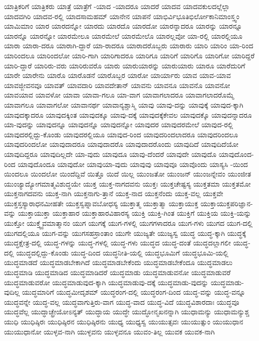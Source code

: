{ಯಾತ್ರಿಕರಿಗೆ
ಯಾತ್ರಿಕರು
ಯಾತ್ರೆ
ಯಾತ್ರೆಗೆ
-ಯಾದ
-ಯಾದರೂ
ಯಾದರೆ
ಯಾದವ
ಯಾದವಕುಲದಲ್ಲೆಲ್ಲಾ
ಯಾದವಗಿರಿ
ಯಾದವ-ರಲ್ಲಿ
ಯಾದಸಾಮಹಮ್
ಯಾನೇನ
ಯಾಪನೆ
ಯಾಭಿರ್ವಿಭೂತಿಭಿರ್ಲೋಕಾನಿಮಾಂಸ್ತ್ವಂ
ಯಾಮಿಮಾಂ
ಯಾರ
ಯಾರದನ್ನೋ
ಯಾರದು
ಯಾರದೊ
ಯಾರದೋ
ಯಾರನ್ನಾದರೂ
ಯಾರನ್ನು
ಯಾರನ್ನೂ
ಯಾರನ್ನೊ
ಯಾರನ್ನೋ
ಯಾರಮೇಲೂ
ಯಾರಮೇಲೆ
ಯಾರಮೇಲೊ
ಯಾರಲ್ಲವೋ
ಯಾ-ರಲ್ಲಿ
ಯಾರಲ್ಲಿಯೂ
ಯಾರಾ
ಯಾರಾ-ದರೂ
ಯಾರಾಗಿ-ದ್ದಾರೆ
ಯಾ-ರಾದರೂ
ಯಾರಾದರೊಬ್ಬರು
ಯಾರಾರು
ಯಾರಿ
ಯಾರಿಂ
ಯಾ-ರಿಂದ
ಯಾರಿಂದಲೂ
ಯಾರಿಂದಲೋ
ಯಾರಿ-ಗಾಗಿ
ಯಾರಿಗಾದರೂ
ಯಾರಿಗೂ
ಯಾರಿಗೆ
ಯಾರಿಗೊ
ಯಾರಿಗೋ
ಯಾರಿದ್ದರೆ
ಯಾರಿ-ದ್ದಾರೆ
ಯಾರಿರು-ವರು
ಯಾರಿರುವರೊ
ಯಾರು
ಯಾರುಯಾರನ್ನು
ಯಾರುಯಾರು
ಯಾರೂ
ಯಾರೆದುರಿಗೆ
ಯಾರೇ
ಯಾರೇನು
ಯಾರೊ
ಯಾರೊಡನೆ
ಯಾರೊಬ್ಬರ
ಯಾರೋ
ಯಾರ್ಯಾರು
ಯಾವ
ಯಾವ-ಯಾವ
ಯಾವಜ್ಜೀವನವೂ
ಯಾವತ್
ಯಾವದಾರಿ
ಯಾವದೇತಾನ್
ಯಾವನು
ಯಾವನೂ
ಯಾವನೊ
ಯಾವನೋ
ಯಾವಯಾವ
ಯಾವಳೋ
ಯಾವಾ
ಯಾವಾ-ಗಲೂ
ಯಾ-ವಾಗ
ಯಾವಾಗಲಾದರೂ
ಯಾವಾಗಲಾದರೊಮ್ಮೆ
ಯಾವಾಗಲೂ
ಯಾವಾಗಲೋ
ಯಾವಾನರ್ಥ
ಯಾವಾನ್ಯಶ್ಚಾಸ್ಮಿ
ಯಾವು
ಯಾವು-ದನ್ನು
ಯಾವುಕ್ಕೆ
ಯಾವುದ-ಕ್ಕಾಗಿ
ಯಾವುದಕ್ಕಾದರೂ
ಯಾವುದಕ್ಕಿಂತ
ಯಾವುದಕ್ಕೂ
ಯಾವು-ದಕ್ಕೆ
ಯಾವುದಕ್ಕೆಕೇವಲ
ಯಾವುದಕ್ಕೊ
ಯಾವುದನ್ನಾದರೂ
ಯಾ-ವುದನ್ನು
ಯಾವುದನ್ನೂ
ಯಾವುದನ್ನೊ
ಯಾವುದನ್ನೋ
ಯಾವುದರ
ಯಾವುದರಮೇಲೆ
ಯಾವುದ-ರಲ್ಲಿ
ಯಾವುದರಲ್ಲಿದ್ದು-ಕೊಂಡು
ಯಾವುದರಲ್ಲಿಯೂ
ಯಾವುದ-ರಿಂದ
ಯಾವುದರಿಂದಲಾದರೂ
ಯಾವುದರಿಂದಲೂ
ಯಾವುದರಿಂದಲೋ
ಯಾವುದಾದರೂ
ಯಾವುದಾದರೊ
ಯಾವುದಾದರೊಂದು
ಯಾವುದಿದೆ
ಯಾವುದಿದೆಯೋ
ಯಾವುದಿದ್ದರೂ
ಯಾವುದಿಲ್ಲದೇ
ಯಾ-ವುದು
ಯಾವುದೂ
ಯಾವು-ದೆಂದರೆ
ಯಾವುದೇ
ಯಾವುದೊ
ಯಾವುದೊಂದ-ರಿಂದ
ಯಾವುದೊಂದೂ
ಯಾವುದೋ
ಯಾವುಯಾ-ವುದು
ಯಾವುವು
ಯಾವುವೂ
ಯಾವೊಂದು
ಯಾಸ್ಯಸಿ
-ಯಿಂದ
ಯಿಂದಲೂ
ಯಿಂದಲೋ
ಯಿಂದೆದ್ದಿವೆ
ಯಿತ್ತೊ
ಯಿದೆ
ಯಿಲ್ಲ
ಯುಂಜತೋ
ಯುಂಜನ್
ಯುಂಜನ್ನೇವಂ
ಯುಂಜೀತ
ಯುಂಜ್ಯಾದ್ಯೋಗಮಾತ್ಮವಿಶುದ್ಧಯೇ
ಯುಕ್ತ
ಯುಕ್ತ-ನಾಗದವನು
ಯುಕ್ತಃ
ಯುಕ್ತಚೇಷ್ಟಸ್ಯ
ಯುಕ್ತತಮಾ
ಯುಕ್ತತಮೋ
ಯುಕ್ತನಾಗದವನು
ಯುಕ್ತ-ನಾಗಿ
ಯುಕ್ತನಾಗು-ತ್ತಾನೆ
ಯುಕ್ತ-ನಾದ
ಯುಕ್ತನೆಂದು
ಯುಕ್ತ-ವಲ್ಲ
ಯುಕ್ತವೇ
ಯುಕ್ತಸ್ತಸ್ಯಾರಾಧನಮೀಹತೇ
ಯುಕ್ತಸ್ವಪ್ನಾವಬೋಧಸ್ಯ
ಯುಕ್ತಾತ್ಮ
ಯುಕ್ತಾತ್ಮಾ
ಯುಕ್ತಾಯುಕ್ತ
ಯುಕ್ತಾಯುಕ್ತಪರಿಜ್ಞಾನ-ವನ್ನು
ಯುಕ್ತಾಯುಕ್ತಾ
ಯುಕ್ತಾಹಾರ
ಯುಕ್ತಾಹಾರವಿಹಾರಸ್ಯ
ಯುಕ್ತಿ
ಯುಕ್ತಿ-ಗಿಂತ
ಯುಕ್ತಿಗೆ
ಯುಕ್ತಿಯ
ಯುಕ್ತಿ-ಯನ್ನು
ಯುಕ್ತೋ
ಯುಕ್ತ್ವೈವಮಾತ್ಮಾನಂ
ಯುಗ
ಯುಗಕ್ಕೆ
ಯುಗ-ಗಳಲ್ಲಿ
ಯುಗಗಳಾದರೂ
ಯುಗ-ಗಳು
ಯುಗದ
ಯುಗ-ದಲ್ಲಿ
ಯುಗದಲ್ಲಿಯೂ
ಯುಗ-ವನ್ನು
ಯುಗಸಹಸ್ರಾಂತಾಂ
ಯುಗೇ
ಯುಜ್ಯತೇ
ಯುಜ್ಯಸ್ವ
ಯುದ್ಧ
ಯುದ್ಧ-ಕ್ಕಾಗಿ
ಯುದ್ಧಕ್ಕೆ
ಯುದ್ಧಕ್ಷೇತ್ರ-ದಲ್ಲಿ
ಯುದ್ಧ-ಗಳನ್ನು
ಯುದ್ಧ-ಗಳಲ್ಲಿ
ಯುದ್ಧ-ಗಳು
ಯುದ್ಧದ
ಯುದ್ಧ-ದಂತೆ
ಯುದ್ಧದಲ್ಲಾಗಲೀ
ಯುದ್ಧ-ದಲ್ಲಿ
ಯುದ್ಧದಲ್ಲಿದ್ದು-ಕೊಂಡು
ಯುದ್ಧ-ದಿಂದ
ಯುದ್ಧನೀತಿ-ಯಲ್ಲಿ
ಯುದ್ಧಭೂಮಿಗೆ
ಯುದ್ಧಭೂಮಿ-ಯಲ್ಲಿ
ಯುದ್ಧಮಾಡದೆ
ಯುದ್ಧಮಾಡಬೇಕಾಗಿದೆ
ಯುದ್ಧಮಾಡಬೇಕೆಂದು
ಯುದ್ಧಮಾಡಬೇಕೆಂದೂ
ಯುದ್ಧಮಾಡಲು
ಯುದ್ಧಮಾಡಿ
ಯುದ್ಧಮಾಡಿದ
ಯುದ್ಧಮಾಡಿದರೆ
ಯುದ್ಧಮಾಡು
ಯುದ್ಧಮಾಡುವನೋ
ಯುದ್ಧಮಾಡುವರೆ
ಯುದ್ಧಮಾಡುವರೋ
ಯುದ್ಧಮಾಡುವುದ-ಕ್ಕಾಗಿ
ಯುದ್ಧಮಾಡುವು-ದಕ್ಕೆ
ಯುದ್ಧಮಾಡು-ವುದನ್ನು
ಯುದ್ಧಮಾಡು-ವುದಿಲ್ಲ
ಯುದ್ಧಮಾರಿಗೆ
ಯುದ್ಧಮೀದೃಶಮ್
ಯುದ್ಧರಂಗ-ದಲ್ಲಿ
ಯುದ್ಧರಂಗ-ದಿಂದ
ಯುದ್ಧ-ವನ್ನು
ಯುದ್ಧ-ವನ್ನೂ
ಯುದ್ಧವನ್ನೇ
ಯುದ್ಧ-ವಲ್ಲ
ಯುದ್ಧವಾಗುತ್ತಿರು-ವಾಗ
ಯುದ್ಧ-ವಾದ
ಯುದ್ಧ-ವಿದೆ
ಯುದ್ಧವಿಶಾರದಾಃ
ಯುದ್ಧವೂ
ಯುದ್ಧವೆಲ್ಲ
ಯುದ್ಧಾಚ್ಛ್ರೇಯೋಽನ್ಯತ್
ಯುದ್ಧಾಯ
ಯುದ್ಧೇ
ಯುದ್ಧೋನ್ಮಖನನ್ನಾಗಿ
ಯುಧಾಮನ್ಯು
ಯುಧಾಮನ್ಯುಶ್ಚ
ಯುಧಿ
ಯುಧಿಷ್ಠಿರಃ
ಯುಧಿಷ್ಠಿರನ
ಯುಧಿಷ್ಠಿರನು
ಯುಧ್ಯ
ಯುಧ್ಯಸ್ವ
ಯುಯುತ್ಸವಃ
ಯುಯುತ್ಸುಂ
ಯುಯುಧಾನ
ಯುಯುಧಾನೋ
ಯುಳ್ಳವ-ನಾಗಿ
ಯುಳ್ಳವನು
ಯುಳ್ಳವನೂ
ಯುವಂ-ತಿಲ್ಲ
ಯುವಕ
ಯುವಕ-ನಾಗಿ
}

